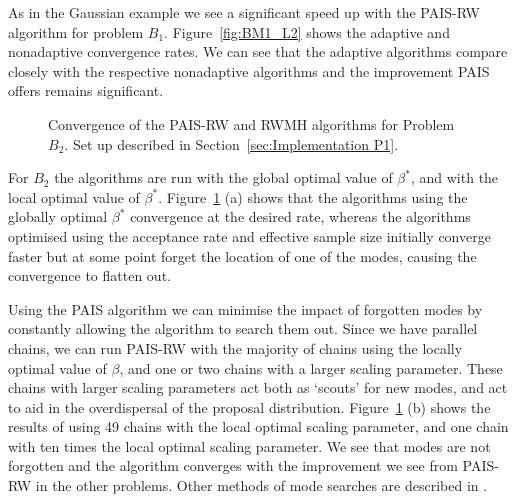 \documentclass[final]{siamltex}
\begin{document}
As in the Gaussian example we see a significant speed up with the
PAIS-RW algorithm for problem $B_1$. Figure~\ref{fig:BM1_L2} shows the adaptive and nonadaptive convergence rates. We can see that the adaptive algorithms compare closely with the
respective nonadaptive algorithms and the improvement PAIS offers remains significant.

\begin{figure}[htb]
\centering
{}
\caption{Convergence of the PAIS-RW and RWMH algorithms for Problem $B_2$. Set up described in Section~\ref{sec:Implementation P1}.}
\label{fig:BM2_L2}
\end{figure}

For $B_2$ the algorithms are run with the global optimal value of $\beta^*$, and with the local optimal value of $\beta^*$. Figure~\ref{fig:BM2_L2} (a) shows that the algorithms using the globally optimal $\beta^*$ convergence at the desired rate, whereas the algorithms optimised using the acceptance rate and effective sample size initially converge faster but at some point forget the location of one of the modes, causing the convergence to flatten out.

Using the PAIS algorithm we can minimise the impact of forgotten modes by constantly allowing the algorithm to search them out. Since we have parallel chains, we can run PAIS-RW with the majority of chains using the locally optimal value of $\beta$, and one or two chains with a larger scaling parameter. These chains with larger scaling parameters act both as `scouts' for new modes, and act to aid in the overdispersal of the proposal distribution. Figure~\ref{fig:BM2_L2} (b) shows the results of using 49 chains with the local optimal scaling parameter, and one chain with ten times the local optimal scaling parameter. We see that modes are not forgotten and the algorithm converges with the improvement we see from PAIS-RW in the other problems. Other methods of mode searches are described in \cite{lan2013wormhole}.
\end{document}
